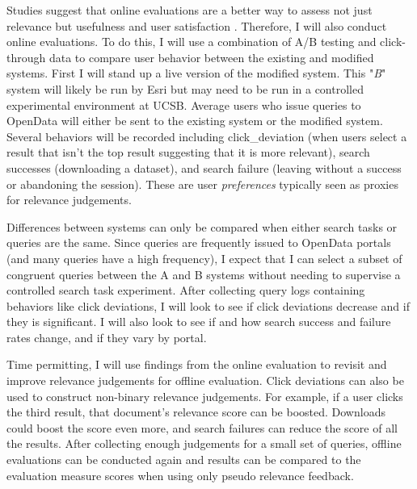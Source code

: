 Studies suggest that online evaluations are a better way to assess not just relevance but usefulness and user satisfaction \cite{Hofmann2016} \cite{Zhang2018} \cite{Chen2017}. Therefore, I will also conduct online evaluations. To do this, I will use a combination of A/B testing and click-through data to compare user behavior between the existing and modified systems. First I will stand up a live version of the modified system. This "\emph{B}" system will likely be run by Esri but may need to be run in a controlled experimental environment at UCSB. Average users who issue queries to OpenData will either be sent to the existing system or the modified system. Several behaviors will be recorded including \gls{click_deviation} (when users select a result that isn't the top result suggesting that it is more relevant), search successes (downloading a dataset), and search failure (leaving without a success or abandoning the session). These are user \emph{preferences} typically seen as proxies for relevance judgements.

Differences between systems can only be compared when either search tasks or queries are the same. Since queries are frequently issued to OpenData portals (and many queries have a high frequency), I expect that I can select a subset of congruent queries between the A and B systems without needing to supervise a controlled search task experiment. After collecting query logs containing behaviors like click deviations, I will look to see if click deviations decrease and if they is significant. I will also look to see if and how search success and failure rates change, and if they vary by portal.

Time permitting, I will use findings from the online evaluation to revisit and improve relevance judgements for offline evaluation. Click deviations can also be used to construct non-binary relevance judgements. For example, if a user clicks the third result, that document's relevance score can be boosted. Downloads could boost the score even more, and search failures can reduce the score of all the results. After collecting enough judgements for a small set of queries, offline evaluations can be conducted again and results can be compared to the evaluation measure scores when using only pseudo relevance feedback.


